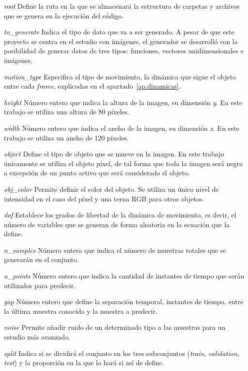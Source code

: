 \begin{basedescript}{\desclabelstyle{\pushlabel}\desclabelwidth{2.75cm}}
\item[\textit{root}] Define la ruta en la que se almacenará la estructura de carpetas y archivos que se genera en la ejecución del código.
\item[\textit{to\_generate}] Indica el tipo de dato que va a ser generado. A pesar de que este proyecto se centra en el estudio con imágenes, el generador se desarrolló con la posibilidad de generar datos de tres tipos: funciones, vectores unidimensionales e imágenes.
\item[\textit{motion\_type}] Especifica el tipo de movimiento, la dinámica que sigue el objeto entre cada \textit{frame}, explicadas en el apartado~\ref{ap.dinamicas}.
\item[\textit{height}]  Número entero que indica la altura de la imagen, su dimensión \textit{y}. En este trabajo se utiliza una altura de 80 píxeles.
\item[\textit{width}]  Número entero que indica el ancho de la imagen, su dimensión \textit{x}. En este trabajo se utiliza un ancho de 120 píxeles.
\item[\textit{object}]  Define el tipo de objeto que se mueve en la imagen. En este trabajo únicamente se utiliza el objeto píxel, de tal forma que toda la imagen será negra a excepción de un punto activo que será considerado el objeto.
\item[\textit{obj\_color}]  Permite definir el color del objeto. Se utiliza un único nivel de intensidad en el caso del píxel y una terna RGB para otros objetos.
\item[\textit{dof}] Establece los grados de libertad de la dinámica de movimiento, es decir, el número de variables que se generan de forma aleatoria en la ecuación que la define.
\item[\textit{n\_samples}]  Número entero que indica el número de muestras totales que se generarán en el conjunto.
\item[\textit{n\_points}] Número entero que indica la cantidad de instantes de tiempo que serán utilizados para predecir.
\item[\textit{gap}] Número entero que define la separación temporal, instantes de tiempo, entre la última muestra conocida y la muestra a predecir.
\item[\textit{noise}] Permite añadir ruido de un determinado tipo a las muestras para un estudio más avanzado.
\item[\textit{split}] Indica si se dividirá el conjunto en los tres subconjuntos (\textit{train}, \textit{validation}, \textit{test}) y la proporción en la que lo hará si así de define.
\end{basedescript}

